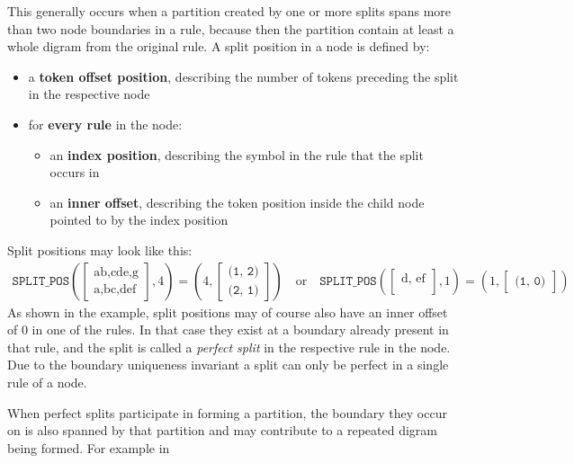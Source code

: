 \noindent This generally occurs when a partition created by one or more splits spans more than two node boundaries in a rule, because then the partition contain at least a whole digram from the original rule.
\bigbreak%
A split position in a node is defined by:
\begin{itemize}
    \item a \textbf{token offset position}, describing the number of tokens preceding the split in the respective node

    \item for \textbf{every rule} in the node:
    \begin{itemize}
        \item an \textbf{index position}, describing the symbol in the rule that the split occurs in
        \item an \textbf{inner offset}, describing the token position inside the child node pointed to by the index position
    \end{itemize}
\end{itemize}
Split positions may look like this:
\begin{align*}
    \texttt{SPLIT\_POS}\left(
    \begin{bmatrix}
        \text{ab,cde,g}\\
        \text{a,bc,def}
    \end{bmatrix},
    4
    \right) = \left(
    4,
    \begin{bmatrix}
        \texttt{(1, 2)}\\
        \texttt{(2, 1)}
    \end{bmatrix}
    \right)
    \quad
    \textrm{or}
    \quad
    \texttt{SPLIT\_POS}\left(
    \begin{bmatrix}
        \text{d, ef}\\
    \end{bmatrix},
    1
    \right) = \left(
    1,
    \begin{bmatrix}
        \texttt{(1, 0)}
    \end{bmatrix}
\right)
\end{align*}
As shown in the example, split positions may of course also have an inner offset of $0$ in one of the rules. In that case they exist at a boundary already present in that rule, and the split is called a \textit{perfect split} in the respective rule in the node. Due to the boundary uniqueness invariant a split can only be perfect in a single rule of a node.

When perfect splits participate in forming a partition, the boundary they occur on is also spanned by that partition and may contribute to a repeated digram being formed. For example in


